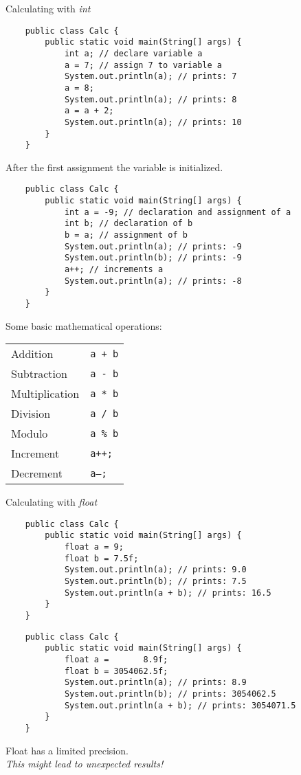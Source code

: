 \begin{frame}{Calculating with \emph{int}}
    \begin{lstlisting}
    public class Calc {
        public static void main(String[] args) {
            int a; // declare variable a
            a = 7; // assign 7 to variable a
            System.out.println(a); // prints: 7
            a = 8;
            System.out.println(a); // prints: 8
            a = a + 2;
            System.out.println(a); // prints: 10
        }
    }\end{lstlisting}
    After the first assignment the variable is initialized.
\framebreak
    \begin{lstlisting}
    public class Calc {
        public static void main(String[] args) {
            int a = -9; // declaration and assignment of a
            int b; // declaration of b
            b = a; // assignment of b
            System.out.println(a); // prints: -9
            System.out.println(b); // prints: -9
            a++; // increments a
            System.out.println(a); // prints: -8
        }
    }\end{lstlisting}
\framebreak
    Some basic mathematical operations:
    \begin{tabular}{ll}
        Addition & \texttt{a + b} \\
        Subtraction & \texttt{a - b} \\
        Multiplication &\texttt{a * b} \\
        Division & \texttt{a / b} \\
        Modulo & \texttt{a \% b} \\
        Increment & \texttt{a++;} \\
        Decrement & \texttt{a--;} \\
    \end{tabular}
\end{frame}

\begin{frame}{Calculating with \emph{float}}
    \begin{lstlisting}
    public class Calc {
        public static void main(String[] args) {
            float a = 9;
            float b = 7.5f;
            System.out.println(a); // prints: 9.0
            System.out.println(b); // prints: 7.5
            System.out.println(a + b); // prints: 16.5
        }
    }\end{lstlisting}
\framebreak
    \begin{lstlisting}
    public class Calc {
        public static void main(String[] args) {
            float a =       8.9f;
            float b = 3054062.5f;
            System.out.println(a); // prints: 8.9
            System.out.println(b); // prints: 3054062.5
            System.out.println(a + b); // prints: 3054071.5
        }
    }\end{lstlisting}
    Float has a limited precision. \\
    \emph{This might lead to unexpected results!}
\end{frame}

